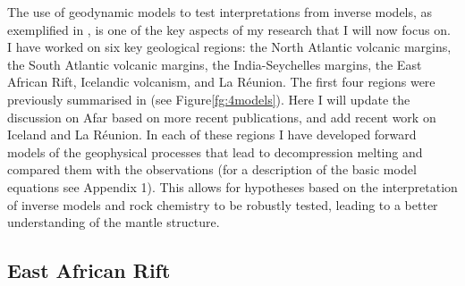 The use of geodynamic models to test interpretations from inverse models, as exemplified in \cite{goes-etal-2012}, is one of the key aspects of my research that I will now focus on. I have worked on six key geological regions: the North Atlantic volcanic margins, the South Atlantic volcanic margins, the India-Seychelles margins, the East African Rift, Icelandic volcanism, and La Réunion. The first four regions were previously summarised in \cite{armitage-2018} (see Figure\ref{fg:4models}). Here I will update the discussion on Afar based on more recent publications, and add recent work on Iceland and La Réunion. In each of these regions I have developed forward models of the geophysical processes that lead to decompression melting and compared them with the observations (for a description of the basic model equations see Appendix 1). This allows for hypotheses based on the interpretation of inverse models and rock chemistry to be robustly tested, leading to a better understanding of the mantle structure.

\subsection{East African Rift}

